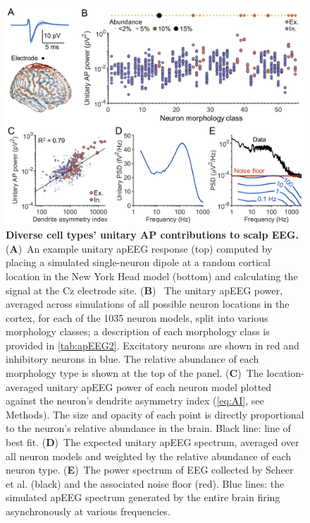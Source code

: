 \begin{figure}[t!]
    \centering
    \includegraphics[width=13.2cm]{Figures/chapter3/figure3.png}
    \caption[Diverse cell types' unitary AP contributions to scalp EEG]{\textbf{Diverse cell types' unitary AP contributions to scalp EEG.} (\textbf{A})~An example unitary apEEG response (top) computed by placing a simulated single-neuron dipole at a random cortical location in the New York Head model (bottom) and calculating the signal at the Cz electrode site. (\textbf{B})~ The unitary apEEG power, averaged across simulations of all possible neuron locations in the cortex, for each of the 1035 neuron models, split into various morphology classes; a description of each morphology class is provided in \autoref{tab:apEEG2}. Excitatory neurons are shown in red and inhibitory neurons in blue. The relative abundance of each morphology type is shown at the top of the panel.  (\textbf{C})~The location-averaged unitary apEEG power of each neuron model plotted against the neuron's dendrite asymmetry index ({\ref{eq:AI}}, see Methods). The size and opacity of each point is directly proportional to the neuron's relative abundance in the brain. Black line: line of best fit. (\textbf{D})~The expected unitary apEEG spectrum, averaged over all neuron models and weighted by the relative abundance of each neuron type. (\textbf{E})~The power spectrum of EEG collected by Scheer et al. \cite{Scheer2006} (black) and the associated noise floor (red). Blue lines: the simulated apEEG spectrum generated by the entire brain firing asynchronously at various frequencies.} 
    \label{fig:uAP_spectrum}
\end{figure}

